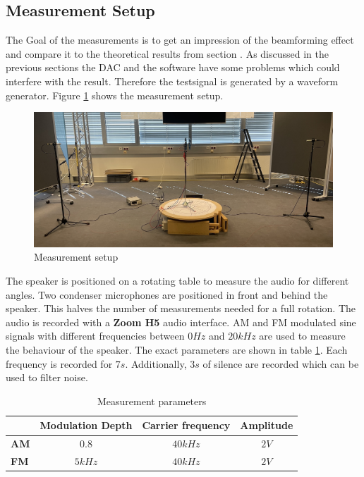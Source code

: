 \subsection{Measurement Setup}

The Goal of the measurements is to get an impression of the beamforming effect and compare it to the theoretical results from section . As discussed in the previous sections the DAC and the software have some problems which could interfere with the result. Therefore the testsignal is generated by a waveform generator. Figure \ref{fig:meas:beam:setup} shows the measurement setup.
%
\begin{figure}[ht]
  \centering
  \includegraphics[height=\smallheight]{src/assets/pictures/measurements/beamforming_meas_setup.JPG}
  \caption{Measurement setup}\label{fig:meas:beam:setup}
\end{figure}
\p
The speaker is positioned on a rotating table to measure the audio for different angles. Two condenser microphones are positioned in front and behind the speaker. This halves the number of measurements needed for a full rotation. The audio is recorded with a \textbf{Zoom H5} audio interface.\p
%
AM and FM modulated sine signals with different frequencies between $0Hz$ and $20kHz$ are used to measure the behaviour of the speaker. The exact parameters are shown in table \ref{tab:meas:beam:params}. Each frequency is recorded for $7s$. Additionally, $3s$ of silence are recorded which can be used to filter noise.
%
\begin{table}[ht]
  \caption{Measurement parameters}\label{tab:meas:beam:params}
  \begin{tabular}{l||c|c|c}
    & \textbf{Modulation Depth} & \textbf{Carrier frequency}  & \textbf{Amplitude}\\
    \hline
    \textbf{AM} & $0.8$         & $40kHz$                     & $2V$ \\
    \textbf{FM} & $5kHz$        & $40kHz$                     & $2V$ \\
  \end{tabular}
\end{table}